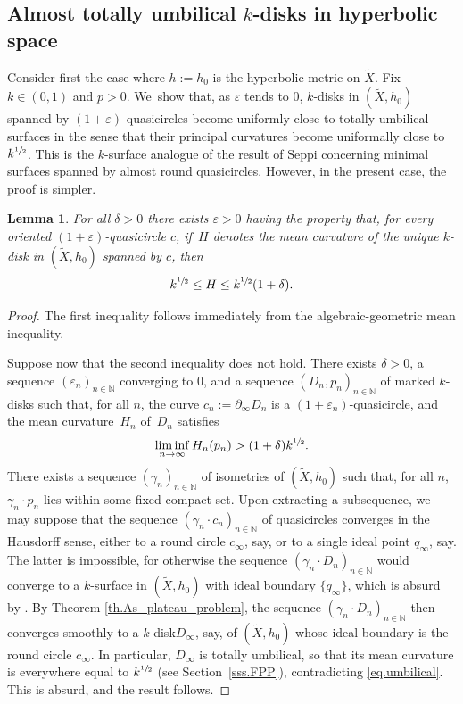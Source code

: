 \documentclass[10pt]{amsart}
\newcommand{\ksurface}{$k$\nobreakdash-surface\xspace}
\newcommand{\kdisk}{$k$\nobreakdash-disk\xspace}
\newcommand{\kdisks}{$k$\nobreakdash-disks\xspace}
\theoremstyle{plain}
\newtheorem{lemma}[theorem]{Lemma}
\theoremstyle{definition}
\newcommand{\N}{{\mathbb N}}
\let\eps\varepsilon
\newcommand{\bord}{\partial_{\infty}}
\begin{document}
\subsection{Almost totally umbilical \kdisks in hyperbolic space}\label{ss.totally_umb} Consider first the case where $h:=h_0$ is the hyperbolic metric on $\tilde{X}$. Fix $k\in(0,1)$ and $p>0$. We~show that, as $\eps$ tends to $0$, \kdisks in $(\tilde{X},h_0)$ spanned by $(1+\eps)$-quasicircles become uniformly close to totally umbilical surfaces in the sense that their principal curvatures become uniformally close to $k^{\sfrac{1}{2}}$. This is the \ksurface analogue of the result \cite{Seppi} of Seppi concerning minimal surfaces spanned by almost round quasicircles. However, in the present case, the proof is simpler.

\begin{lemma}\label{l.almost_tot_umbilical}
For all $\delta>0$ there exists $\eps>0$ having the property that, for every oriented $(1+\eps)$-quasicircle $c$, if~$H$ denotes the mean curvature of the unique \kdisk in $(\tilde{X},h_0)$ spanned by $c$, then
\begin{equation*}
k^{\sfrac{1}{2}}\leq H\leq k^{\sfrac{1}{2}}(1+\delta).
\end{equation*}
\end{lemma}

\begin{proof}
The first inequality follows immediately from the algebraic-geometric mean inequality.

Suppose now that the second inequality does not hold. There exists $\delta>0$, a sequence $(\eps_n)_{n\in\N}$ converging to $0$, and a sequence $(D_n,p_n)_{n\in\N}$ of marked \kdisks such that, for all $n$, the curve $c_n:=\bord D_n$ is a $(1+\eps_n)$-quasicircle, and the mean curvature~$H_n$ of~$D_n$ satisfies
\begin{equation}\label{eq.umbilical}
\liminf_{n\to\infty} H_n(p_n)>(1+\delta)k^{\sfrac{1}{2}}.
\end{equation}
There exists a sequence $(\gamma_n)_{n\in\N}$ of isometries of $(\tilde{X},h_0)$ such that, for all $n$, $\gamma_n\cdot p_n$ lies within some fixed compact set. Upon extracting a subsequence, we may suppose that the sequence $(\gamma_n\cdot c_n)_{n\in\N}$ of quasicircles converges in the Hausdorff sense, either to a round circle $c_\infty$, say, or to a single ideal point $q_\infty$, say. The latter is impossible, for otherwise the sequence $(\gamma_n\cdot D_n)_{n\in\N}$ would converge to a \ksurface in $(\tilde{X},h_0)$ with ideal boundary $\{q_\infty\}$, which is absurd by \cite[Prop.\,2.5.3]{LabourieInvent}. By Theorem \ref{th.As_plateau_problem}, the sequence $(\gamma_n\cdot D_n)_{n\in\N}$ then converges smoothly to a \kdisk $D_\infty$, say, of $(\tilde{X},h_0)$ whose ideal boundary is the round circle $c_\infty$. In particular, $D_\infty$ is totally umbilical, so that its mean curvature is everywhere equal to $k^{\sfrac{1}{2}}$ (see Section~\ref{sss.FPP}), contradicting \eqref{eq.umbilical}. This is absurd, and the result follows.
\end{proof}
\end{document}
